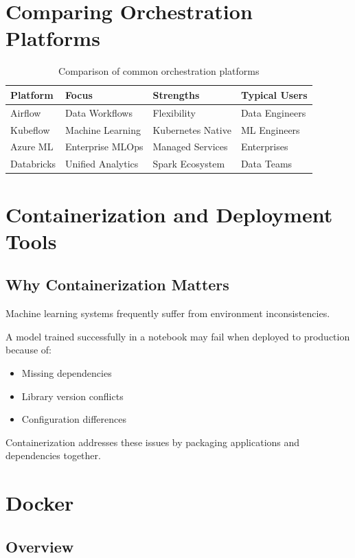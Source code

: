 \section{Comparing Orchestration Platforms}

\begin{table}[h]
\centering
\begin{tabular}{p{3cm}p{3cm}p{3cm}p{3cm}}
\toprule
Platform & Focus & Strengths & Typical Users \\
\midrule
Airflow & Data Workflows & Flexibility & Data Engineers \\
Kubeflow & Machine Learning & Kubernetes Native & ML Engineers \\
Azure ML & Enterprise MLOps & Managed Services & Enterprises \\
Databricks & Unified Analytics & Spark Ecosystem & Data Teams \\
\bottomrule
\end{tabular}
\caption{Comparison of common orchestration platforms}
\end{table}

\section{Containerization and Deployment Tools}

\subsection{Why Containerization Matters}

Machine learning systems frequently suffer from environment inconsistencies.

A model trained successfully in a notebook may fail when deployed to production because of:

\begin{itemize}
    \item Missing dependencies
    \item Library version conflicts
    \item Configuration differences
\end{itemize}

Containerization addresses these issues by packaging applications and dependencies together.

\section{Docker}

\subsection{Overview}

